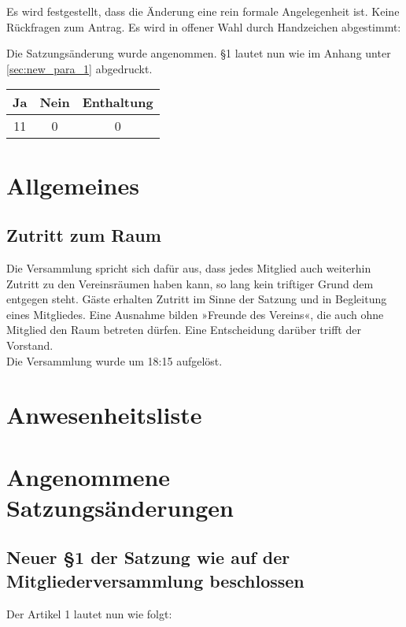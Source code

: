 \documentclass{scrartcl}
\begin{document}
Es wird festgestellt, dass die Änderung eine rein formale Angelegenheit
ist. Keine Rückfragen zum Antrag. Es wird in offener Wahl durch
Handzeichen abgestimmt:

Die Satzungsänderung wurde angenommen. §1 lautet nun wie im Anhang unter
\ref{sec:new_para_1} abgedruckt.

\begin{table}[h!]
    \centering
    \begin{tabular}{c|c|c}
        \textbf{Ja} & \textbf{Nein} & \textbf{Enthaltung} \\ \hline
        11 & 0 & 0
    \end{tabular}
\end{table}

\section{Allgemeines}

\subsection{Zutritt zum Raum}
Die Versammlung spricht sich dafür aus, dass jedes Mitglied auch
weiterhin Zutritt zu den Vereinsräumen haben kann, so lang kein
triftiger Grund dem entgegen steht.
Gäste erhalten Zutritt im Sinne der Satzung und in Begleitung eines
Mitgliedes.
Eine Ausnahme bilden »Freunde des Vereins«, die auch ohne Mitglied den
Raum betreten dürfen.
Eine Entscheidung darüber trifft der Vorstand. \\[1ex]

Die Versammlung wurde um 18:15 aufgelöst.

\newpage 
\appendix{}
\section{Anwesenheitsliste}
\newpage 
\section{Angenommene Satzungsänderungen}
\subsection{Neuer §1 der Satzung wie auf der Mitgliederversammlung beschlossen}
Der Artikel 1 lautet nun wie folgt: 
\end{document}
